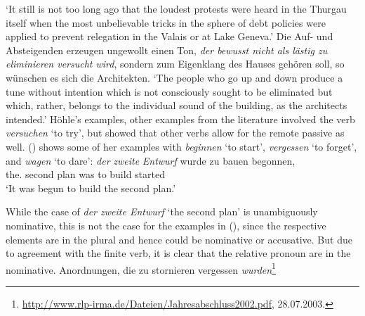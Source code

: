 \glt `It still is not too long ago that the loudest protests were heard in the Thurgau itself 
when the most unbelievable tricks in the sphere of debt policies were applied to prevent relegation in the Valais or at Lake Geneva.' 
\ex Die Auf- und Absteigenden erzeugen ungewollt einen Ton, \emph{der bewusst nicht als lästig zu eliminieren versucht wird}, 
    sondern zum Eigenklang des Hauses gehören soll, so wünschen es sich die Architekten.\footnotemark
{}
\glt `The people who go up and down produce a tune without intention which is not consciously sought to
be eliminated but which, rather, belongs to the individual sound of the building, as the
architects intended.'
\zl
Höhle's examples, other examples from the literature involved the verb \emph{versuchen} `to try',
but \citet{Wurmbrand2003a} showed that other verbs allow for the remote passive as well. ()
shows some of her examples with \emph{beginnen} `to start', \emph{vergessen} `to forget', and
\emph{wagen} `to dare':
\eal
\ex
\gll \emph{der} \emph{zweite} \emph{Entwurf} wurde zu bauen begonnen,\footnotemark\\
     the.\NOM{} second        plan           was   to build started\\ 
\glt `It was begun to build the second plan.' 
\zl

While the case of \emph{der zweite Entwurf} `the second plan' is unambiguously nominative, this is
not the case for the examples in (), since the respective elements are in the
plural and hence could be nominative or accusative. But due to agreement with the finite verb, it is
clear that the relative pronoun are in the nominative.
\eal
\ex Anordnungen, die zu stornieren vergessen \emph{wurden}\footnote{
        \url{http://www.rlp-irma.de/Dateien/Jahresabschluss2002.pdf}, 28.07.2003.
}

